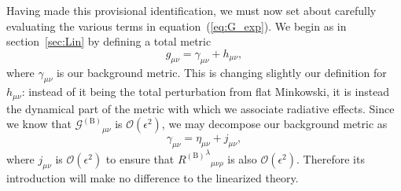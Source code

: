 \documentclass[a4paper, 11pt, titlepage, twoside]{report}
\newcommand{\eqnref}[1]{equation~(\ref{eq:#1})}
\newcommand{\secref}[1]{section~\ref{sec:#1}}
\newcommand{\order}[1]{\ensuremath{\mathcal{O}({#1})}}
\begin{document}
Having made this provisional identification, we must now set about carefully evaluating the various terms in \eqnref{G_exp}. We begin as in \secref{Lin} by defining a total metric
\begin{equation}
g_{\mu\nu} = \gamma_{\mu\nu} + h_{\mu\nu},
\end{equation}
where $\gamma_{\mu\nu}$ is our background metric. This is changing slightly our definition for $h_{\mu\nu}$: instead of it being the total perturbation from flat Minkowski, it is instead the dynamical part of the metric with which we associate radiative effects. Since we know that ${\mathcal{G}^{(\mathrm{B})}}_{\mu\nu}$ is $\order{\epsilon^2}$, we may decompose our background metric as
\begin{equation}
\gamma_{\mu\nu} = \eta_{\mu\nu} + j_{\mu\nu},
\end{equation}
where $j_{\mu\nu}$ is $\order{\epsilon^2}$ to ensure that ${{R^{(\mathrm{B})}}^\lambda}_{\mu\nu\rho}$ is also $\order{\epsilon^2}$. Therefore its introduction will make no difference to the linearized theory.
\end{document}
